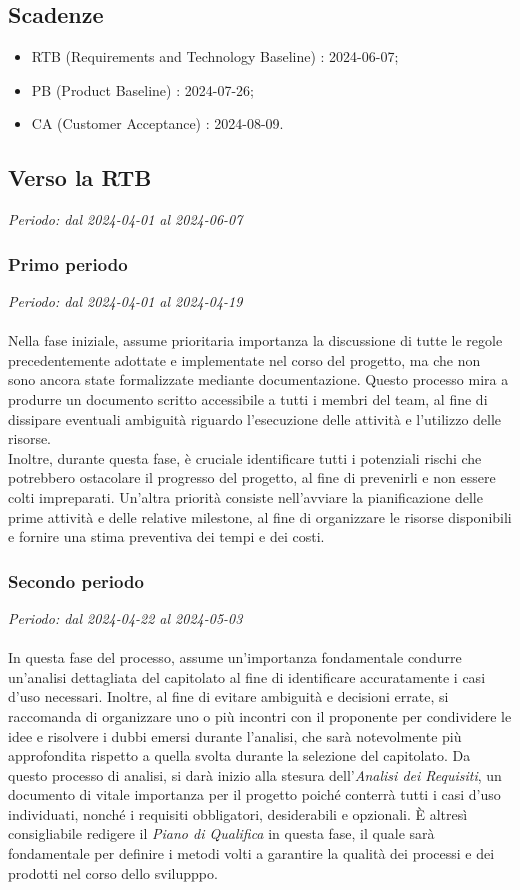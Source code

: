 \subsection{Scadenze}
\begin{itemize}
\setlength\itemsep{0em}
    \item RTB (Requirements and Technology Baseline) : 2024-06-07;
    \item PB (Product Baseline) : 2024-07-26;
    \item CA (Customer Acceptance) : 2024-08-09.
\end{itemize}
\subsection{Verso la RTB}
\textit{Periodo: dal 2024-04-01 al 2024-06-07}
\subsubsection{Primo periodo}
\textit{Periodo: dal 2024-04-01 al 2024-04-19}
\\\\
Nella fase iniziale, assume prioritaria importanza la discussione di tutte le regole precedentemente adottate e implementate nel corso del progetto, ma che non sono ancora state formalizzate mediante documentazione. Questo processo mira a produrre un documento scritto accessibile a tutti i membri del team, al fine di dissipare eventuali ambiguità riguardo l'esecuzione delle attività e l'utilizzo delle risorse.
\\
Inoltre, durante questa fase, è cruciale identificare tutti i potenziali rischi che potrebbero ostacolare il progresso del progetto, al fine di prevenirli e non essere colti impreparati. Un'altra priorità consiste nell'avviare la pianificazione delle prime attività e delle relative milestone, al fine di organizzare le risorse disponibili e fornire una stima preventiva dei tempi e dei costi.

\subsubsection{Secondo periodo}
\textit{Periodo: dal 2024-04-22 al 2024-05-03}
\\\\
In questa fase del processo, assume un'importanza fondamentale condurre un'analisi dettagliata del capitolato al fine di identificare accuratamente i casi d'uso necessari. Inoltre, al fine di evitare ambiguità e decisioni errate, si raccomanda di organizzare uno o più incontri con il proponente per condividere le idee e risolvere i dubbi emersi durante l'analisi, che sarà notevolmente più approfondita rispetto a quella svolta durante la selezione del capitolato.
Da questo processo di analisi, si darà inizio alla stesura dell'\textit{Analisi dei Requisiti}, un documento di vitale importanza per il progetto poiché conterrà tutti i casi d'uso individuati, nonché i requisiti obbligatori, desiderabili e opzionali.
È altresì consigliabile redigere il \textit{Piano di Qualifica} in questa fase, il quale sarà fondamentale per definire i metodi volti a garantire la qualità dei processi e dei prodotti nel corso dello svilupppo.

